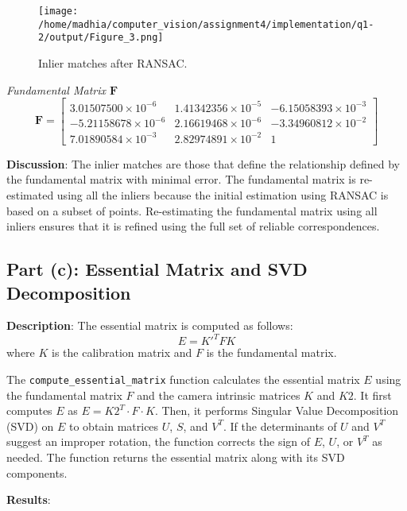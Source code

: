\documentclass{article}
\begin{document}
\begin{figure}[h!]
    \centering
    \texttt{[image: /home/madhia/computer\_vision/assignment4/implementation/q1-2/output/Figure\_3.png]}
    \caption{Inlier matches after RANSAC.}
\end{figure}

\textit{Fundamental Matrix $\mathbf{F}$}
\[
\mathbf{F} = \begin{bmatrix} 
3.01507500 \times 10^{-6} & 1.41342356 \times 10^{-5} & -6.15058393 \times 10^{-3} \\ 
-5.21158678 \times 10^{-6} & 2.16619468 \times 10^{-6} & -3.34960812 \times 10^{-2} \\ 
7.01890584 \times 10^{-3} & 2.82974891 \times 10^{-2} & 1 
\end{bmatrix}
\]

\textbf{Discussion}: %
The inlier matches are those that define the relationship defined by the fundamental matrix with minimal error. The fundamental matrix is re-estimated using all the inliers
because the initial estimation using RANSAC is based on a subset of points. 
Re-estimating the fundamental matrix using all inliers ensures that it is refined using the full set of reliable correspondences.

\subsection{Part (c): Essential Matrix and SVD Decomposition}
\textbf{Description}: %
The essential matrix is computed as follows:
\[
E = K'^{T} F K
\]
where $K$ is the calibration matrix and $F$ is the fundamental matrix.

The \texttt{compute\_essential\_matrix} function calculates the essential matrix $E$ using the fundamental matrix $F$ and the camera intrinsic matrices $K$ and $K2$. 
It first computes $E$ as $E = K2^{T} \cdot F \cdot K$. Then, it performs Singular Value Decomposition (SVD) on $E$ to obtain matrices $U$, $S$, and $V^{T}$. 
If the determinants of $U$ and $V^{T}$ suggest an improper rotation, the function corrects the sign of $E$, $U$, or $V^{T}$ as needed. 
The function returns the essential matrix along with its SVD components.

\textbf{Results}: %
\end{document}
